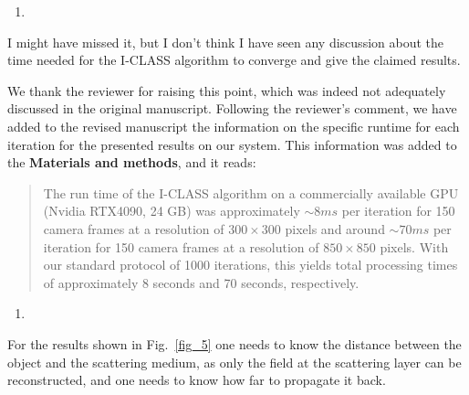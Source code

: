 \documentclass[12pt]{article}
\newenvironment{solved_reviewercomment}
    {\begin{tcolorbox}[width=\linewidth,colback=gray!5,colframe=solved_commentcolor!50,title=Reviewer Comment,left=5pt,right=5pt]}
    {\end{tcolorbox}}
\newenvironment{ourresponse}
    {\begin{tcolorbox}[width=\linewidth,breakable,enhanced,colback=gray!5,colframe=responsecolor!50,title=Response,left=5pt,right=5pt]}
    {\end{tcolorbox}}
\begin{document}
\begin{enumerate}[label=\arabic*., resume]
\item \leavevmode
\end{enumerate}
\vspace{-1em}
\begin{solved_reviewercomment}
I might have missed it, but I don't think I have seen any discussion about the time needed for the I-CLASS algorithm to converge and give the claimed results.
\end{solved_reviewercomment}
\begin{ourresponse}
We thank the reviewer for raising this point, which was indeed not adequately discussed in the original manuscript. Following the reviewer's comment, we have added to the revised manuscript the information on the specific runtime for each iteration for the presented results on our system. This information was added to the \textbf{Materials and methods}, and it reads:

\begin{quote}
    The run time of the I-CLASS algorithm on a commercially available GPU (Nvidia RTX4090, 24 GB) was approximately $\sim 8ms$ per iteration for 150 camera frames at a resolution of $300 \times 300$ pixels and around $\sim 70ms$ per iteration for 150 camera frames at a resolution of $850 \times 850$ pixels. With our standard protocol of 1000 iterations, this yields total processing times of approximately 8 seconds and 70 seconds, respectively.
\end{quote}
\end{ourresponse}



        
\begin{enumerate}[label=\arabic*., resume]
\item \leavevmode
\end{enumerate}
\vspace{-1em}
\begin{solved_reviewercomment}
    For the results shown in Fig.~\ref{fig_5} one needs to know the distance between the object and the scattering medium, as only the field at the scattering layer can be reconstructed, and one needs to know how far to propagate it back.
\end{solved_reviewercomment}
\end{document}
